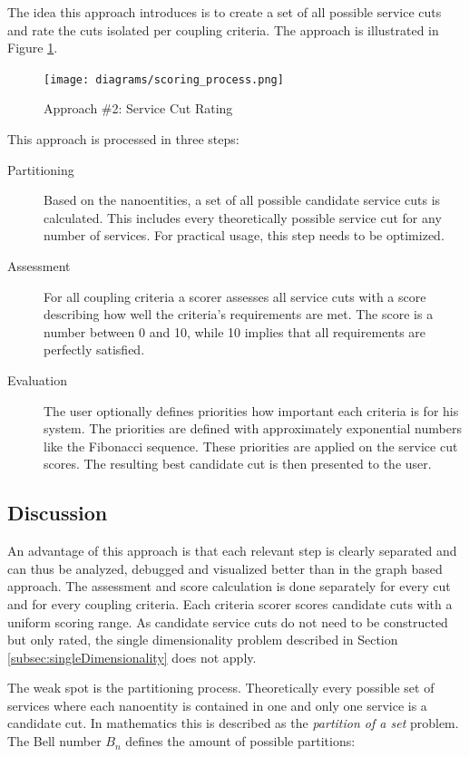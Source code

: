 The idea this approach introduces is to create a set of all possible service cuts and rate the cuts isolated per coupling criteria. The approach is illustrated in Figure \ref{fig:setProcess}.


\begin{figure}[H]
	\begin{center}
		\texttt{[image: diagrams/scoring\_process.png]}
	\end{center}
	\caption{Approach \#2: Service Cut Rating}
	\label{fig:setProcess}
\end{figure}

This approach is processed in three steps:

\begin{description}
	\item[Partitioning] Based on the nanoentities, a set of all possible candidate service cuts is calculated. This includes every theoretically possible service cut for any number of services. For practical usage, this step needs to be optimized. 
	\item[Assessment] For all coupling criteria a scorer assesses all service cuts with a score describing how well the criteria's requirements are met. The score is a number between 0 and 10, while 10 implies that all requirements are perfectly satisfied. 
	\item[Evaluation] The user optionally defines priorities how important each criteria is for his system. The priorities are defined with approximately exponential numbers like the Fibonacci sequence. These priorities are applied on the service cut scores. The resulting best candidate cut is then presented to the user.
\end{description}

\subsection{Discussion}

An advantage of this approach is that each relevant step is clearly separated and can thus be analyzed, debugged and visualized better than in the graph based approach. The assessment and score calculation is done separately for every cut and for every coupling criteria. Each criteria scorer scores candidate cuts with a uniform scoring range. As candidate service cuts do not need to be constructed but only rated, the single dimensionality problem described in Section \ref{subsec:singleDimensionality} does not apply.

The weak spot is the partitioning process. Theoretically every possible set of services where each nanoentity is contained in one and only one service is a candidate cut. In mathematics this is described as the \textit{partition of a set}\cite{partitionOfASet} problem. The Bell number $B_n$ defines the amount of possible partitions: 


